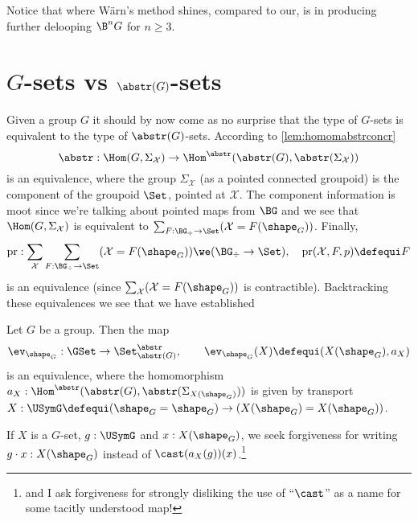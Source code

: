 Notice that where W\"arn's method shines, compared to our, is in
producing further delooping $\B^n G$ for $n\geq 3$.


\section{$G$-sets vs $\abstr(G)$-sets}
\label{sec:Gsetsabstrconcr}

Given a group $G$ it should by now come as no surprise that the type of $G$-sets is equivalent to the type of $\abstr(G)$-sets.
According to \cref{lem:homomabstrconcr}
$$\abstr:\Hom(G,\Sigma_{\mathcal X})\to\Hom^\abstr(\abstr(G),\abstr(\Sigma_{\mathcal X}))$$
is an equivalence, where the group $\Sigma_{\mathcal X}$ (as a pointed connected groupoid) is the component of the groupoid $\Set$, pointed at $\mathcal X$.  The component information is moot since we're talking about pointed maps from $\BG$ and we see that $\Hom(G,\Sigma_{\mathcal X})$ is equivalent to $\sum_{F:\BG_\div\to\Set}(\mathcal X=F(\shape_G))$.  Finally,
$$\mathrm{pr}:\sum_{\mathcal X}\sum_{F:\BG_\div\to\Set}(\mathcal X=F(\shape_G))\we
(\BG_\div\to\Set),\quad \mathrm{pr}(\mathcal X,F,p)\defequi F
$$
is an equivalence (since $\sum_{\mathcal X}(\mathcal X=F(\shape_G))$ is contractible).
Backtracking these equivalences we see that we have established
\begin{lemma}
  \label{lem:actionsconcreteandabstract}
  Let $G$ be a group.  Then the map
  $$\ev_{\shape_G}:\GSet\to\Set^\abstr_{\abstr(G)},\qquad \ev_{\shape_G}(X)\defequi(X(\shape_G),a_X)
$$
is an equivalence, where the homomorphism $a_X:\Hom^\abstr(\abstr(G), \abstr(\Sigma_{X(\shape_G)}))$ is given by transport $X:\USymG\defequi(\shape_G=\shape_G)\to (X(\shape_G)=X(\shape_G))$.
\end{lemma}
If $X$ is a $G$-set, $g:\USymG$ and $x:X(\shape_G)$, we seek forgiveness for writing $g\cdot x:X(\shape_G)$ instead of $\cast(a_X(g))(x)$.\footnote{and I ask forgiveness for strongly disliking the use of ``$\cast$'' as a name for some tacitly understood map!}

